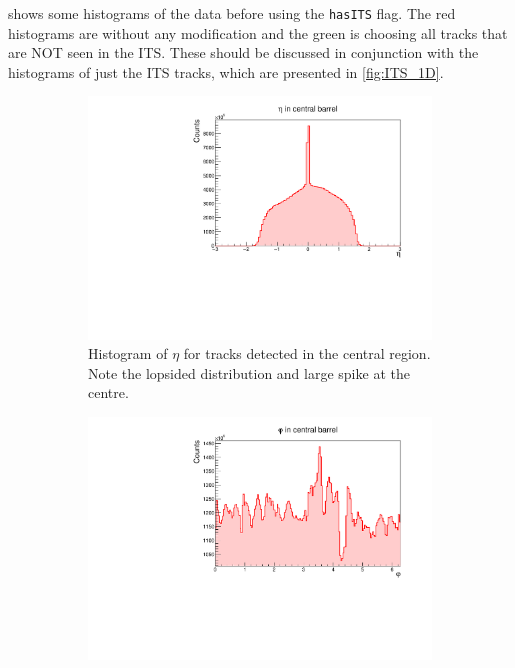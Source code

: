  shows some histograms of the data before using the \texttt{hasITS} flag. The red histograms are without any modification and the green is choosing all tracks that are NOT seen in the ITS. These should be discussed in conjunction with the histograms of just the ITS tracks, which are presented in \cref{fig:ITS_1D}.

\begin{figure}[h]%
    \centering
    \begin{subfigure}[t]{.49\linewidth}
        \centering
        \includegraphics[width=\linewidth]{Plots/pass4_TracksIU_nohasITS/eta.pdf}
        \caption{Histogram of $\eta$ for tracks detected in the central region. Note the lopsided distribution and large spike at the centre.}
        \label{fig:nohasITS_eta}
    \end{subfigure}
    \hfill
    \begin{subfigure}[t]{.49\linewidth}
        \centering
        \includegraphics[width=\linewidth]{Plots/pass4_TracksIU_nohasITS/phi.pdf}

\end{subfigure}
\end{figure}

